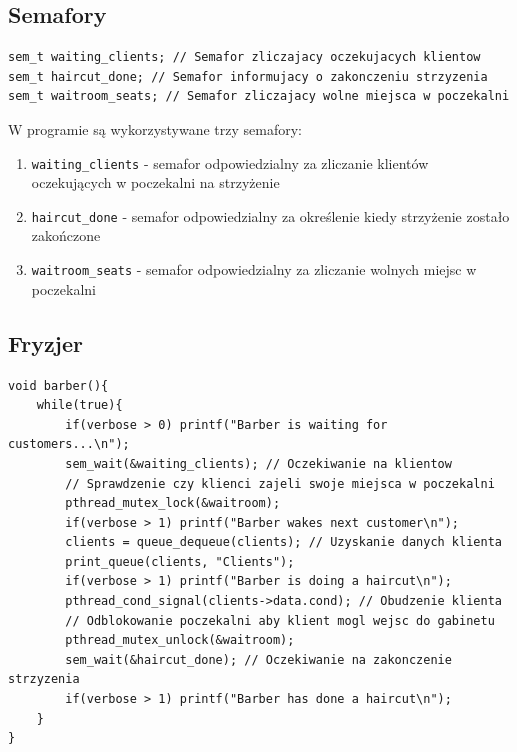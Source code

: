 \documentclass[12pt,a4paper]{article}
\begin{document}
	\subsection{Semafory}
	
	\begin{center}
		\begin{minipage}{0.8\linewidth}
\begin{lstlisting}[caption = Deklaracje semaforów.]
sem_t waiting_clients; // Semafor zliczajacy oczekujacych klientow
sem_t haircut_done; // Semafor informujacy o zakonczeniu strzyzenia
sem_t waitroom_seats; // Semafor zliczajacy wolne miejsca w poczekalni
\end{lstlisting}
		\end{minipage}
	\end{center}
	
	W programie są wykorzystywane trzy semafory:
	\begin{enumerate}
		\item \texttt{waiting{\_}clients} - semafor odpowiedzialny za
			zliczanie klientów oczekujących w poczekalni na strzyżenie
		\item \texttt{haircut{\_}done} - semafor odpowiedzialny za
			określenie kiedy strzyżenie zostało zakończone
		\item \texttt{waitroom{\_}seats} - semafor odpowiedzialny za
			zliczanie wolnych miejsc w poczekalni
	\end{enumerate}
	
	\subsection{Fryzjer}	
	
	\begin{center}
		\begin{minipage}{0.82\linewidth}
\begin{lstlisting}[caption = Funkcja fryzjera.]
void barber(){
    while(true){
        if(verbose > 0) printf("Barber is waiting for customers...\n");
        sem_wait(&waiting_clients); // Oczekiwanie na klientow
        // Sprawdzenie czy klienci zajeli swoje miejsca w poczekalni
        pthread_mutex_lock(&waitroom);
        if(verbose > 1) printf("Barber wakes next customer\n");
        clients = queue_dequeue(clients); // Uzyskanie danych klienta
        print_queue(clients, "Clients");
        if(verbose > 1) printf("Barber is doing a haircut\n");
        pthread_cond_signal(clients->data.cond); // Obudzenie klienta
        // Odblokowanie poczekalni aby klient mogl wejsc do gabinetu
        pthread_mutex_unlock(&waitroom);
        sem_wait(&haircut_done); // Oczekiwanie na zakonczenie strzyzenia
        if(verbose > 1) printf("Barber has done a haircut\n");
    }
}
\end{lstlisting}
		\end{minipage}
	\end{center}
	
\end{document}
